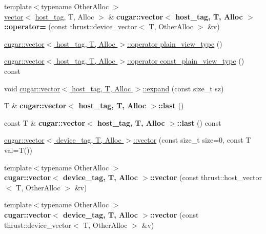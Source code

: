 \begin{DoxyCompactItemize}
\item 
\mbox{\label{group___basic_ga69c00b16374593c556eaa328d6e890f1}} 
{\footnotesize template$<$typename Other\+Alloc $>$ }\\\hyperlink{structcugar_1_1vector}{vector}$<$ \hyperlink{structcugar_1_1host__tag}{host\+\_\+tag}, T, Alloc $>$ \& {\bfseries cugar\+::vector$<$ host\+\_\+tag, T, Alloc $>$\+::operator=} (const thrust\+::device\+\_\+vector$<$ T, Other\+Alloc $>$ \&v)
\item 
\hyperlink{group___basic_gae0a95fb635c4cf188b029a0dd5ca670e}{cugar\+::vector$<$ host\+\_\+tag, T, Alloc $>$\+::operator plain\+\_\+view\+\_\+type} ()
\item 
\hyperlink{group___basic_ga338f7b6f3de7b1dc36a125fd4704cff8}{cugar\+::vector$<$ host\+\_\+tag, T, Alloc $>$\+::operator const\+\_\+plain\+\_\+view\+\_\+type} () const
\item 
void \hyperlink{group___basic_ga8974bf847d3e9ef8bbf2e6318c001087}{cugar\+::vector$<$ host\+\_\+tag, T, Alloc $>$\+::expand} (const size\+\_\+t sz)
\item 
\mbox{\label{group___basic_gaa8407930ed73a49d7dd8719655a42138}} 
T \& {\bfseries cugar\+::vector$<$ host\+\_\+tag, T, Alloc $>$\+::last} ()
\item 
\mbox{\label{group___basic_gaf9d188292ac63fbef47443c9b33c6e31}} 
const T \& {\bfseries cugar\+::vector$<$ host\+\_\+tag, T, Alloc $>$\+::last} () const
\item 
\hyperlink{group___basic_ga7954a5910e324f03b69b16b0fc0475fa}{cugar\+::vector$<$ device\+\_\+tag, T, Alloc $>$\+::vector} (const size\+\_\+t size=0, const T val=T())
\item 
\mbox{\label{group___basic_gae8784adde88313456e35325f5d792702}} 
{\footnotesize template$<$typename Other\+Alloc $>$ }\\{\bfseries cugar\+::vector$<$ device\+\_\+tag, T, Alloc $>$\+::vector} (const thrust\+::host\+\_\+vector$<$ T, Other\+Alloc $>$ \&v)
\item 
\mbox{\label{group___basic_gaef81cc74127dd8cb1f9d2bb79af8bac7}} 
{\footnotesize template$<$typename Other\+Alloc $>$ }\\{\bfseries cugar\+::vector$<$ device\+\_\+tag, T, Alloc $>$\+::vector} (const thrust\+::device\+\_\+vector$<$ T, Other\+Alloc $>$ \&v)

\end{DoxyCompactItemize}
